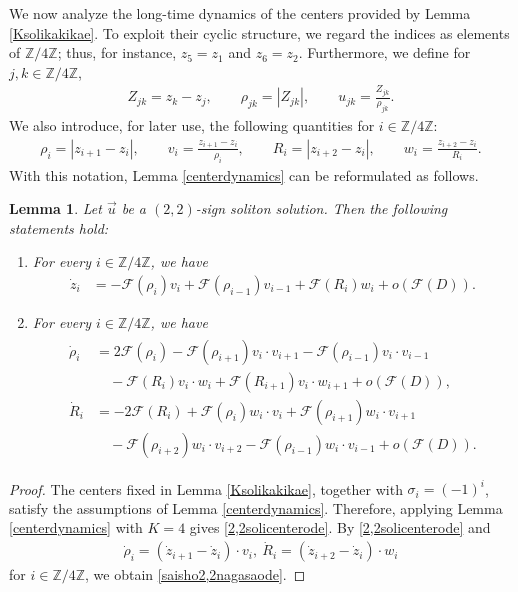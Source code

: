 \documentclass[10pt,a4paper]{amsart}
\newtheorem{lemma}[theorem]{Lemma}
\numberwithin{equation}{section}
\begin{document}
We now analyze the long-time dynamics of the centers provided by Lemma \ref{Ksolikakikae}. To exploit their cyclic structure, we regard the indices as elements of $\mathbb{Z}/4\mathbb{Z}$; thus, for instance, $z_5=z_1$ and $z_6=z_2$. Furthermore, we define for $j,k\in\mathbb{Z}/4\mathbb{Z}$,
\begin{align}\label{hendef}
Z_{jk}=z_k-z_j,\qquad
\rho_{jk}=|Z_{jk}|,\qquad
u_{jk}=\frac{Z_{jk}}{\rho_{jk}}.
\end{align}
We also introduce, for later use, the following quantities for $i\in\mathbb{Z}/4\mathbb{Z}$:
\begin{align}\label{iroirodef}
\rho_i=|z_{i+1}-z_i|,\qquad
v_i=\frac{z_{i+1}-z_i}{\rho_i},\qquad
R_i=|z_{i+2}-z_i|,\qquad
w_i=\frac{z_{i+2}-z_i}{R_i}.
\end{align}
With this notation, Lemma \ref{centerdynamics} can be reformulated as follows.
\begin{lemma}\label{2,2centerlem}
Let $\vec{u}$ be a $(2,2)$-sign soliton solution. Then the following statements hold:
\begin{enumerate}
\item For every $i\in \mathbb{Z}/4\mathbb{Z}$, we have
\begin{align}\label{2,2solicenterode}
\dot{z}_i&=-\mathcal{F}(\rho_i)v_i+\mathcal{F}(\rho_{i-1})v_{i-1}+\mathcal{F}(R_i)w_i+o\left(\mathcal{F}(D)\right).
\end{align}
\item For every $i\in \mathbb{Z}/4\mathbb{Z}$, we have
\begin{align}\label{saisho2,2nagasaode}
\begin{aligned}
\dot{\rho}_i&=2\mathcal{F}(\rho_i)-\mathcal{F}(\rho_{i+1})v_i\cdot v_{i+1}-\mathcal{F}(\rho_{i-1})v_i\cdot v_{i-1}
\\
&\quad-\mathcal{F}(R_i)v_i\cdot w_i+\mathcal{F}(R_{i+1})v_i\cdot w_{i+1}+o\left(\mathcal{F}(D)\right),
\\
\dot{R}_i&=-2\mathcal{F}(R_i)+\mathcal{F}(\rho_i)w_i\cdot v_i+\mathcal{F}(\rho_{i+1})w_i\cdot v_{i+1}
\\
&\quad -\mathcal{F}(\rho_{i+2})w_i\cdot v_{i+2}-\mathcal{F}(\rho_{i-1})w_i\cdot v_{i-1}+o\left(\mathcal{F}(D)\right).
\end{aligned}
\end{align}
\end{enumerate}
\end{lemma}
\begin{proof}
The centers fixed in Lemma \ref{Ksolikakikae}, together with $\sigma_i=(-1)^i$, satisfy the assumptions of Lemma
\ref{centerdynamics}. Therefore, applying Lemma \ref{centerdynamics} with $K=4$ gives \eqref{2,2solicenterode}. By \eqref{2,2solicenterode} and
\begin{align*}
\dot{\rho}_i=\left(\dot{z}_{i+1}-\dot{z}_i\right)\cdot v_i,\ \dot{R}_i=\left(\dot{z}_{i+2}-\dot{z}_i\right)\cdot w_i
\end{align*}
for $i\in \mathbb{Z}/4\mathbb{Z}$, we obtain \eqref{saisho2,2nagasaode}.
\end{proof}
\end{document}
